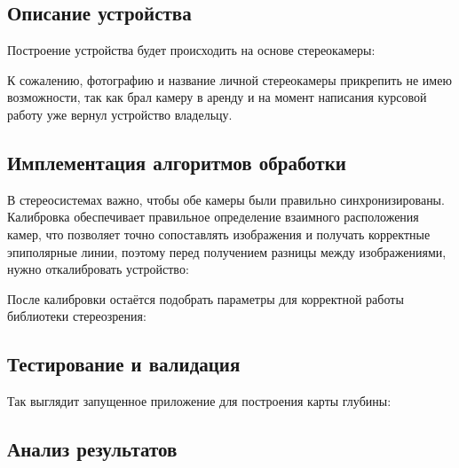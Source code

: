 



\subsection{Описание устройства}

Построение устройства будет происходить на основе стереокамеры:


К сожалению, фотографию и название личной стереокамеры прикрепить не имею возможности, так как брал камеру в аренду и на момент написания курсовой работу уже вернул устройство владельцу.




\subsection{Имплементация алгоритмов обработки}

В стереосистемах важно, чтобы обе камеры были правильно синхронизированы. Калибровка обеспечивает правильное определение взаимного расположения камер, что позволяет точно сопоставлять изображения и получать корректные эпиполярные линии, поэтому перед получением разницы между изображениями, нужно откалибровать устройство:


После калибровки остаётся подобрать параметры для корректной работы библиотеки стереозрения:





\subsection{Тестирование и валидация}

Так выглядит запущенное приложение для построения карты глубины:





\subsection{Анализ результатов}

